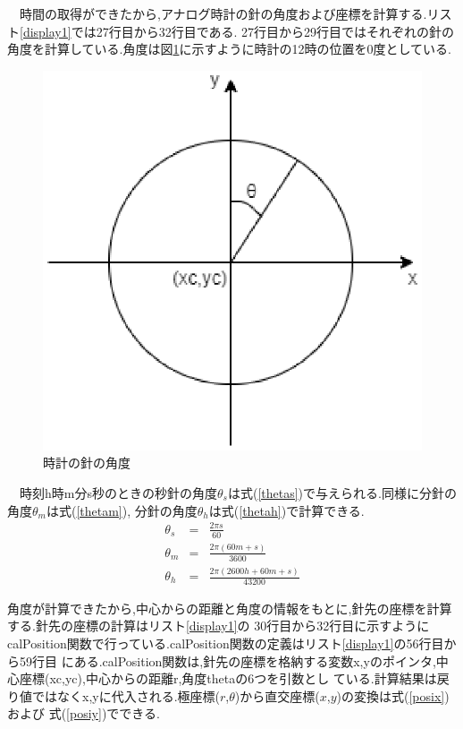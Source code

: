 \documentclass[a4j]{jarticle}
\begin{document}
            　時間の取得ができたから,アナログ時計の針の角度および座標を計算する.リスト\ref{display1}では27行目から32行目である.
            27行目から29行目ではそれぞれの針の角度を計算している.角度は図\ref{tokei}に示すように時計の12時の位置を0度としている.
    \begin{figure}[H]
      \centering
      \includegraphics[scale=0.6]{tokei.eps}
      \caption{時計の針の角度}
       \label{tokei}
      \end{figure}

      　時刻h時m分s秒のときの秒針の角度$\theta_s$は式(\ref{thetas})で与えられる.同様に分針の角度$\theta_m$は式(\ref{thetam}),
      分針の角度$\theta_h$は式(\ref{thetah})で計算できる.
          \begin{eqnarray}
            \label{thetas}
      \theta_s &=& \frac{2\pi s}{60}  \\
            \label{thetam}
      \theta_m &=& \frac{2\pi(60m+s)}{3600}  \\
            \label{thetah}
      \theta_h &=& \frac{2\pi(2600h+60m+s)}{43200}
        \end{eqnarray}

        角度が計算できたから,中心からの距離と角度の情報をもとに,針先の座標を計算する.針先の座標の計算はリスト\ref{display1}の
        30行目から32行目に示すようにcalPosition関数で行っている.calPosition関数の定義はリスト\ref{display1}の56行目から59行目
        にある.calPosition関数は,針先の座標を格納する変数x,yのポインタ,中心座標(xc,yc),中心からの距離r,角度thetaの6つを引数とし
        ている.計算結果は戻り値ではなくx,yに代入される.極座標($r$,$\theta$)から直交座標($x$,$y$)の変換は式(\ref{posix})および
        式(\ref{posiy})でできる.
\end{document}
